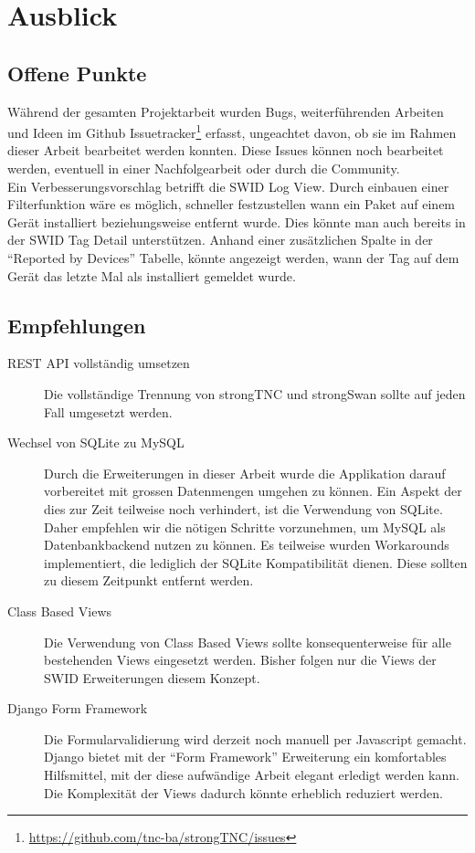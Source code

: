 \chapter{Ausblick}

\section{Offene Punkte} 
Während der gesamten Projektarbeit wurden Bugs, weiterführenden Arbeiten und
Ideen im Github
Issuetracker\footnote{\url{https://github.com/tnc-ba/strongTNC/issues}} erfasst,
ungeachtet davon, ob sie im Rahmen dieser Arbeit bearbeitet werden konnten.
Diese Issues können noch bearbeitet werden, eventuell in einer Nachfolgearbeit
oder durch die Community.\\
Ein Verbesserungsvorschlag betrifft die SWID Log View. Durch einbauen
einer Filterfunktion wäre es möglich, schneller festzustellen wann ein Paket auf
einem Gerät installiert beziehungsweise entfernt wurde. Dies könnte man auch
bereits in der SWID Tag Detail unterstützen. Anhand einer zusätzlichen Spalte in
der \enquote{Reported by Devices} Tabelle, könnte angezeigt werden, wann der Tag
auf dem Gerät das letzte Mal als installiert gemeldet wurde.


\section{Empfehlungen} 

\begin{description} 

	\item[REST API vollständig umsetzen] Die vollständige Trennung von strongTNC
	und strongSwan sollte auf jeden Fall umgesetzt werden.
	
	\item[Wechsel von SQLite zu MySQL] Durch die Erweiterungen in dieser Arbeit
	wurde die Applikation darauf vorbereitet mit grossen Datenmengen umgehen zu
	können. Ein Aspekt der dies zur Zeit teilweise noch verhindert, ist die
	Verwendung von SQLite. Daher empfehlen wir die nötigen Schritte vorzunehmen, um
	MySQL als Datenbankbackend nutzen zu können. Es teilweise wurden Workarounds
	implementiert, die lediglich der SQLite Kompatibilität dienen. Diese sollten zu
	diesem Zeitpunkt entfernt werden.
	
	\item[Class Based Views] Die Verwendung von Class Based Views sollte
	konsequenterweise für alle bestehenden Views eingesetzt werden. Bisher folgen
	nur die Views der SWID Erweiterungen diesem Konzept.
	
	\item[Django Form Framework] Die Formularvalidierung wird derzeit noch manuell
	per Javascript gemacht. Django bietet mit der \enquote{Form Framework}
	Erweiterung ein komfortables Hilfsmittel, mit der diese aufwändige Arbeit
	elegant erledigt werden kann. Die Komplexität der Views dadurch könnte
	erheblich reduziert werden.
	
\end{description}